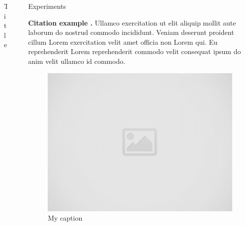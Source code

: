 \documentclass[final]{beamer}
\newlength{\sepwid}
\newlength{\onecolwid}
\newlength{\twocolwid}
\begin{document}
\begin{frame}[t]
\begin{columns}[t]
\begin{column}{\twocolwid}
\begin{columns}[t,totalwidth=\twocolwid]
\begin{column}{\onecolwid}
\begin{block}{Title}
            \end{block}
            
        
        \end{column} %
    
    \end{columns} %
    
    \end{column} %
    
    \begin{column}{\sepwid}\end{column} %
    
    \begin{column}{\onecolwid} %
    
        
        \begin{block}{Experiments}
        
            \textbf{Citation example \cite{Wang2012}.} Ullamco exercitation ut elit aliquip mollit aute laborum do nostrud commodo incididunt. Veniam deserunt proident cillum Lorem exercitation velit amet officia non Lorem qui. Eu reprehenderit Lorem reprehenderit commodo velit consequat ipsum do anim velit ullamco id commodo.

            \begin{figure}
                \includegraphics[width=0.8\linewidth]{images/placeholder.jpg}
                \caption{My caption}
            \end{figure}
        

\end{block}
\end{column}
\end{columns}
\end{frame}
\end{document}
